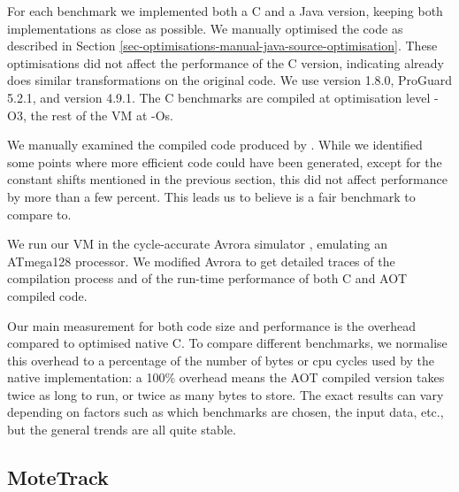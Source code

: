 For each benchmark we implemented both a C and a Java version, keeping both implementations as close as possible. We manually optimised the code as described in Section \ref{sec-optimisations-manual-java-source-optimisation}. These optimisations did not affect the performance of the C version, indicating  already does similar transformations on the original code. We use  version 1.8.0, ProGuard 5.2.1, and  version 4.9.1. The C benchmarks are compiled at optimisation level -O3, the rest of the VM at -Os.

We manually examined the compiled code produced by . While we identified some points where more efficient code could have been generated, except for the constant shifts mentioned in the previous section, this did not affect performance by more than a few percent. This leads us to believe  is a fair benchmark to compare to.

We run our VM in the cycle-accurate Avrora simulator \cite{Titzer:2005vb}, emulating an ATmega128 processor. We modified Avrora to get detailed traces of the compilation process and of the run-time performance of both C and AOT compiled code.

Our main measurement for both code size and performance is the overhead compared to optimised native C. To compare different benchmarks, we normalise this overhead to a percentage of the number of bytes or cpu cycles used by the native implementation: a 100\% overhead means the AOT compiled version takes twice as long to run, or twice as many bytes to store. The exact results can vary depending on factors such as which benchmarks are chosen, the input data, etc., but the general trends are all quite stable.


\subsection{MoteTrack}
\label{sec-evaluation-benchmark-implementation-motetrack}

